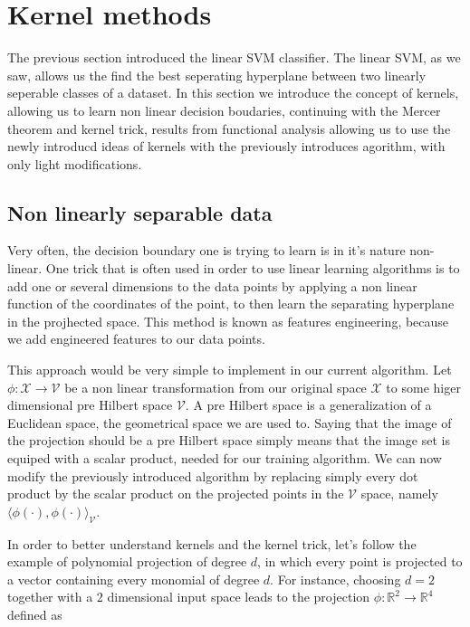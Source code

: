 \section{Kernel methods}

The previous section introduced the linear SVM classifier. The linear SVM, as we saw, allows us the find the best seperating hyperplane between two linearly seperable classes of a dataset. In this section we introduce the concept of kernels, allowing us to learn non linear decision boudaries, continuing with the Mercer theorem and kernel trick, results from functional analysis allowing us to use the newly introducd ideas of kernels with the previously introduces agorithm, with only light modifications.

\subsection{Non linearly separable data}

Very often, the decision boundary one is trying to learn is in it's nature non-linear. One trick that is often used in order to use linear learning algorithms is to add one or several dimensions to the data points by applying a non linear function of the coordinates of the point, to then learn the separating hyperplane in the projhected space. This method is known as features engineering, because we add engineered features to our data points.


This approach would be very simple to implement in our current algorithm. Let $\phi : \mathcal{X} \rightarrow \mathcal{V}$ be a non linear transformation from our original space $\mathcal{X}$ to some higer dimensional pre Hilbert space $\mathcal{V}$. A pre Hilbert space is a generalization of a Euclidean space, the geometrical space we are used to. Saying that the image of the projection should be a pre Hilbert space simply means that the image set is equiped with a scalar product, needed for our training algorithm. We can now modify the previously introduced algorithm by replacing simply every dot product by the scalar product on the projected points in the $\mathcal{V}$ space, namely $\langle \phi(\cdot), \phi(\cdot)\rangle _{\mathcal{V}}$.


In order to better understand kernels and the kernel trick, let's follow the example of polynomial projection of degree $d$, in which every point is projected to a vector containing every monomial of degree $d$. For instance, choosing $d = 2$ together with a $2$ dimensional input space leads to the projection $\phi : \mathbb{R}^2 \rightarrow \mathbb{R}^4$ defined as

